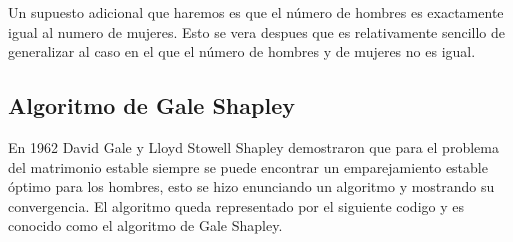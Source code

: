 Un supuesto adicional que haremos es que el número de hombres es exactamente igual al numero de mujeres. Esto se vera despues que es relativamente sencillo de generalizar al caso en el que el número de hombres y de mujeres no es igual. 

%


\subsection{Algoritmo de Gale Shapley}
En 1962 David Gale y Lloyd Stowell Shapley demostraron que para el problema del matrimonio estable siempre se puede encontrar un emparejamiento estable óptimo para los hombres, esto se hizo enunciando un algoritmo y mostrando su convergencia. El algoritmo queda representado por el siguiente codigo y es conocido como el algoritmo de Gale Shapley.

